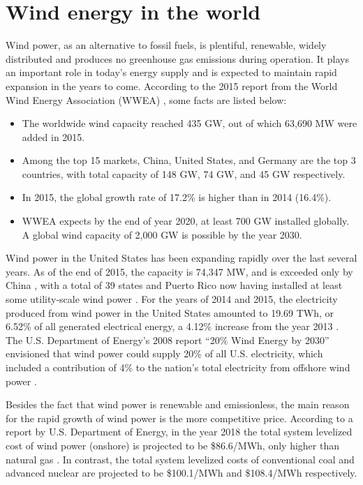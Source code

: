 \documentclass{umthesis}
\begin{document}
\section{Wind energy in the world}
Wind power, as an alternative to fossil fuels, is plentiful, renewable, widely distributed and produces no greenhouse gas emissions during operation. It plays an important role in today's energy supply and is expected to maintain rapid expansion in the years to come. According to the 2015 report from the World Wind Energy Association (WWEA) \cite{WWEA_a}, some facts are listed below:

\begin{itemize}
  \item The worldwide wind capacity reached 435 GW, out of which 63,690 MW were added in 2015.
  \item Among the top 15 markets, China, United States, and Germany are the top 3 countries, with total capacity of 148 GW, 74 GW, and 45 GW respectively.
  \item In 2015, the global growth rate of 17.2\% is higher than in 2014 (16.4\%). 
  \item WWEA expects by the end of year 2020, at least 700 GW installed globally. A global wind capacity of 2,000 GW is possible by the year 2030.
\end{itemize}

Wind power in the United States has been expanding rapidly over the last several years. As of the end of 2015, the capacity is 74,347 MW, and is exceeded only by China \cite{WWEA_a}, with a total of 39 states and Puerto Rico now having installed at least some utility-scale wind power \cite{AWEA}. For the years of 2014 and 2015, the electricity produced from wind power in the United States amounted to 19.69 TWh, or 6.52\% of all generated electrical energy, a 4.12\% increase from the year 2013 \cite{EPM}. The U.S. Department of Energy's 2008 report ``20\% Wind Energy by 2030'' envisioned that wind power could supply 20\% of all U.S. electricity, which included a contribution of 4\% to the nation's total electricity from offshore wind power \cite{thirty_by_twenty}. 

Besides the fact that wind power is renewable and emissionless, the main reason for the rapid growth of wind power is the more competitive price. According to a report by U.S. Department of Energy, in the year 2018 the total system levelized cost of wind power (onshore) is projected to be \$86.6/MWh, only higher than natural gas \cite{energy_cost}. In contrast, the total system levelized costs of conventional coal and advanced nuclear are projected to be \$100.1/MWh and \$108.4/MWh respectively.
\end{document}
